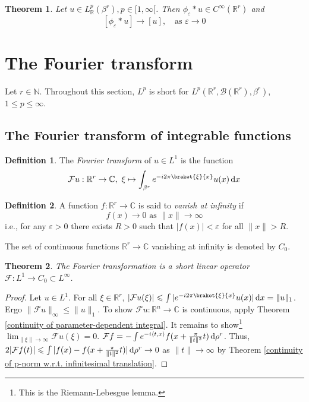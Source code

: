 \documentclass[11pt, a4paper, openany]{book}
\newtheorem{thm}{Theorem}\newtheorem{lem}{Lemma}\newtheorem{crl}{Corollary}
\theoremstyle{definition}
\newtheorem{define}{Definition}\newtheorem{exam}{Example}\newtheorem{remark}{Remark}
\begin{document}
    \begin{thm}
        Let $u\in L^p_\mathbb{R}(\beta^r),p\in[1,\infty[$. Then $\phi_\varepsilon*u\in C^\infty(\mathbb{R}^r)$ and
        \[[\phi_\varepsilon*u]\to[u],\quad\text{as }\varepsilon\to 0\]
    \end{thm}
\section{The Fourier transform}
    Let $r\in\mathbb{N}$. Throughout this section, $L^p$ is short for $L^p(\mathbb{R}^r,\mathscr{B}(\mathbb{R}^r),\beta^r)$, $1\leqslant p\leqslant \infty$.
\subsection{The Fourier transform of integrable functions}
    \begin{define}
        The \textit{Fourier transform} of $u\in L^1$ is the function
    \[
        \mathcal{F}u%
        :\mathbb{R}^r\rightarrow \mathbb{C},\,\, \xi\mapsto \int_{\beta^r} e^{-i2\pi\braket{\xi}{x}}u(x)\odif x
    \]
    \end{define}
    \begin{define}
        A function $f:\mathbb{R}^r\rightarrow\mathbb{C}$ is said to \textit{vanish at infinity} if 
        \[
            f(x)\to 0\text{ as }\|x\|\to\infty
        \]
        i.e., for any $\varepsilon>0$ there exists $R>0$ such that $|f(x)|<\varepsilon$ for all $\|x\|>R$.

        The set of continuous functions $\mathbb{R}^r\rightarrow\mathbb{C}$ vanishing at infinity is denoted by $C_0$.
    \end{define}
    \begin{thm}\label{Fourier transform of a L^1 function is bounded by its 1-norm}
        The Fourier transformation is a short %
        linear operator $\mathscr{F}:L^1\rightarrow C_0\subset L^\infty$.
    \end{thm}
    \begin{proof}
        Let $u\in L^1$. For all $\xi\in\mathbb{R}^r$, $|\mathcal{F}u(\xi)|\leqslant \int |e^{-i2\pi\braket{\xi}{x}}u(x)|\odif x= \|u\|_1$. Ergo $\|\mathcal{F}u\|_\infty\leqslant \|u\|_1$. To show $\mathcal{F}u:\mathbb{R}^n\rightarrow \mathbb{C}$ is continuous, apply Theorem \ref{continuity of parameter-dependent integral}. It remains to show\footnote{This is the Riemann-Lebesgue lemma.} $\lim_{\|\xi\|\to\infty} \mathcal{F}u(\xi)=0$. $\mathcal{F}f=-\int e^{-i\left<t,x\right>}f(x+\frac{\pi}{\|t\|^2}t)\odif\rho^r$. Thus, $2|\mathcal{F}f(t)|\leqslant \int |f(x)-f(x+\frac{\pi}{\|t\|^2}t)|\odif\rho^r\to 0$ as $\|t\|\to\infty$ by Theorem \ref{continuity of p-norm w.r.t. infinitesimal translation}.
    \end{proof}
\end{document}
